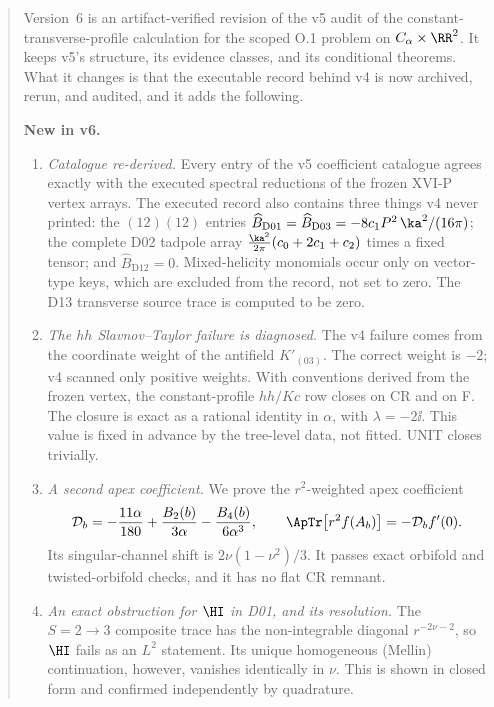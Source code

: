 \begin{abstract}
Version~6 is an artifact-verified revision of the v5 audit of the
constant-transverse-profile calculation for the scoped O.1 problem
on \(C_\alpha\times\RR^2\).
It keeps v5's structure, its evidence classes, and its conditional
theorems. What it changes is that the executable record behind v4
is now archived, rerun, and audited, and it adds the following.

\smallskip\noindent\textbf{New in v6.}
\begin{enumerate}[label=\textup{(\arabic*)},leftmargin=1.6em]
\item \emph{Catalogue re-derived.}
Every entry of the v5 coefficient catalogue agrees exactly with the
executed spectral reductions of the frozen XVI-P vertex arrays.
The executed record also contains three things v4 never printed:
the \((12)(12)\) entries
\(\widehat B_{\mathrm{D01}}=\widehat B_{\mathrm{D03}}
=-8c_1P^2\,\ka^2/(16\pi)\); the complete D02 tadpole array
\(\tfrac{\ka^2}{2\pi}(c_0+2c_1+c_2)\) times a fixed tensor;
and \(\widehat B_{\mathrm{D12}}=0\).
Mixed-helicity monomials occur only on vector-type keys, which are
excluded from the record, not set to zero.
The D13 transverse source trace is computed to be zero.

\item \emph{The \(hh\) Slavnov--Taylor failure is diagnosed.}
The v4 failure comes from the coordinate weight of the antifield
\(K'_{(03)}\). The correct weight is \(-2\); v4 scanned only
positive weights.
With conventions derived from the frozen vertex, the
constant-profile \(hh/Kc\) row closes on CR and on F.
The closure is exact as a rational identity in \(\alpha\), with
\(\lambda=-2\ii\). This value is fixed in advance by the tree-level
data, not fitted. UNIT closes trivially.

\item \emph{A second apex coefficient.}
We prove the \(r^2\)-weighted apex coefficient
\[
\mathcal D_b=-\frac{11\alpha}{180}+\frac{B_2(b)}{3\alpha}
-\frac{B_4(b)}{6\alpha^3},
\qquad
\ApTr\bigl[r^2f(A_b)\bigr]=-\mathcal D_bf'(0).
\]
Its singular-channel shift is \(2\nu(1-\nu^2)/3\).
It passes exact orbifold and twisted-orbifold checks, and it has no
flat CR remnant.

\item \emph{An exact obstruction for \(\HI\) in D01, and its
resolution.}
The \(S=2\to3\) composite trace has the non-integrable diagonal
\(r^{-2\nu-2}\), so \(\HI\) fails as an \(L^2\) statement.
Its unique homogeneous (Mellin) continuation, however, vanishes
identically in \(\nu\). This is shown in closed form and confirmed
independently by quadrature.


\end{enumerate}
\end{abstract}
